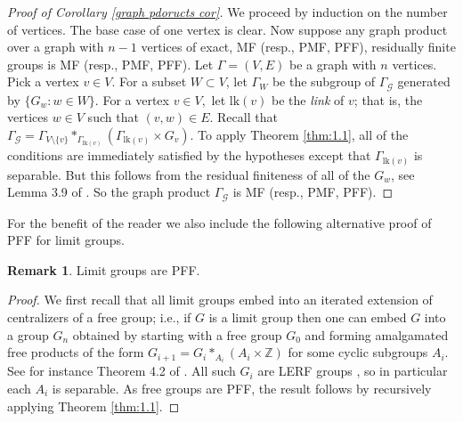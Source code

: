 \documentclass[10pt]{amsart}
\theoremstyle{definition}
\newtheorem{rmk}[thm]{Remark}
\begin{document}
\begin{proof}[Proof of Corollary \ref{graph pdoructs cor}]
    We proceed by induction on the number of vertices. The base case of one vertex is clear. Now suppose any graph product over a graph with $n-1$ vertices of exact, MF (resp., PMF, PFF), residually finite groups is MF (resp., PMF, PFF). Let $\Gamma=(V,E)$ be a  graph with $n$ vertices. Pick a vertex $v\in V.$ For a subset $W\subset V$, let $\Gamma_W$ be the subgroup of $\Gamma_{\mathcal G}$ generated by $\{G_w : w\in W\}$. For a vertex $v\in V,$ let $\mathrm{lk}(v)$ be the \emph{link} of $v$; that is, the vertices $w\in V$ such that $(v,w)\in E$. Recall that $\Gamma_{\mathcal G} = \Gamma_{V\setminus\{v\}} *_{\Gamma_{\mathrm{lk}(v)}}(\Gamma_{\mathrm{lk}(v)}\times G_v)$. To apply Theorem \ref{thm:1.1}, all of the conditions are immediately satisfied by the hypotheses except that ${\Gamma_{\mathrm{lk}(v)}}$ is separable. But this follows from the residual finiteness of all of the $G_w$, see Lemma 3.9 of \cite{HsuWise1999}. So the graph product $\Gamma_{\mathcal G}$ is MF (resp., PMF, PFF).
\end{proof}

For the benefit of the reader we also include the following alternative proof of PFF for limit groups.

\begin{rmk}\label{limit groups MF}
    Limit groups are PFF. 
\end{rmk}

\begin{proof}
    We first recall that all limit groups embed into an iterated extension of centralizers of a free group; i.e., if $G$ is a limit group then one can embed $G$ into a group $G_n$ obtained by starting with a free group $G_0$ and forming amalgamated free products of the form $G_{i+1} = G_i *_{A_i} (A_i\times \mathbb Z)$ for some cyclic subgroups $A_i$. See for instance Theorem 4.2 of  \cite{ChampetierGuirardel2005}. All such $G_i$ are LERF groups \cite{Wilton2008Halls}, so in particular each $A_i$ is separable. As free groups are PFF, the result follows by recursively applying Theorem \ref{thm:1.1}.
\end{proof}





\end{document}
